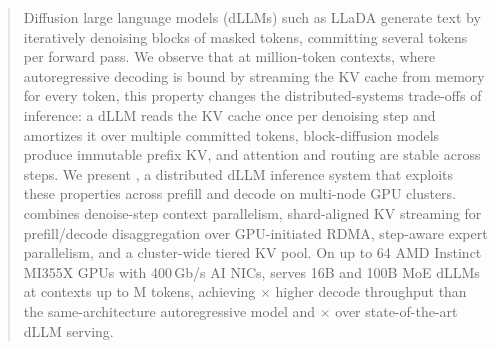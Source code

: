 \begin{abstract}
Diffusion large language models (dLLMs) such as LLaDA generate text by iteratively denoising blocks of
masked tokens, committing several tokens per forward pass. We observe that at million-token contexts,
where autoregressive decoding is bound by streaming the KV cache from memory for every token, this
property changes the distributed-systems trade-offs of inference: a dLLM reads the KV cache once per
denoising step and amortizes it over multiple committed tokens, block-diffusion models produce
immutable prefix KV, and attention and routing are stable across steps. We present \sys, a
distributed dLLM inference system that exploits these properties across prefill and decode on
multi-node GPU clusters. \sys combines denoise-step context parallelism, shard-aligned KV streaming
for prefill/decode disaggregation over GPU-initiated RDMA, step-aware expert parallelism, and a
cluster-wide tiered KV pool. On up to 64 AMD Instinct MI355X GPUs with 400\,Gb/s AI NICs, \sys serves
16B and 100B MoE dLLMs at contexts up to M tokens, achieving $\times$ higher decode
throughput than the same-architecture autoregressive model and $\times$ over state-of-the-art
dLLM serving.
\end{abstract}
